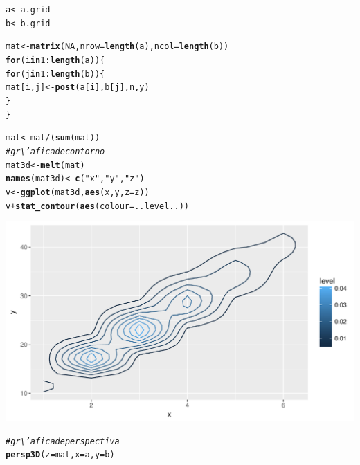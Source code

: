 \documentclass[10pt,openright]{book}\usepackage[]{graphicx}\usepackage[]{color}
\makeatletter
\def\maxwidth{ %
  \ifdim\Gin@nat@width>\linewidth
    \linewidth
  \else
    \Gin@nat@width
  \fi
}
\newcommand{\hlnum}[1]{\textcolor[rgb]{0.686,0.059,0.569}{#1}}%
\newcommand{\hlstr}[1]{\textcolor[rgb]{0.192,0.494,0.8}{#1}}%
\newcommand{\hlcom}[1]{\textcolor[rgb]{0.678,0.584,0.686}{\textit{#1}}}%
\newcommand{\hlopt}[1]{\textcolor[rgb]{0,0,0}{#1}}%
\newcommand{\hlstd}[1]{\textcolor[rgb]{0.345,0.345,0.345}{#1}}%
\newcommand{\hlkwa}[1]{\textcolor[rgb]{0.161,0.373,0.58}{\textbf{#1}}}%
\newcommand{\hlkwb}[1]{\textcolor[rgb]{0.69,0.353,0.396}{#1}}%
\newcommand{\hlkwc}[1]{\textcolor[rgb]{0.333,0.667,0.333}{#1}}%
\newcommand{\hlkwd}[1]{\textcolor[rgb]{0.737,0.353,0.396}{\textbf{#1}}}%
\newenvironment{kframe}{%
 \def\at@end@of@kframe{}%
 \ifinner\ifhmode%
  \def\at@end@of@kframe{\end{minipage}}%
  \begin{minipage}{\columnwidth}%
 \fi\fi%
 \def\FrameCommand##1{\hskip\@totalleftmargin \hskip-\fboxsep
 \colorbox{shadecolor}{##1}\hskip-\fboxsep
     \hskip-\linewidth \hskip-\@totalleftmargin \hskip\columnwidth}%
 \MakeFramed {\advance\hsize-\width
   \@totalleftmargin\z@ \linewidth\hsize
   \@setminipage}}%
 {\par\unskip\endMakeFramed%
 \at@end@of@kframe}
\newenvironment{knitrout}{}{} %
\makeatother
\begin{document}
\begin{knitrout}
\color{fgcolor}\begin{kframe}
\begin{alltt}
 \hlstd{a}\hlkwb{<-}\hlstd{a.grid}
 \hlstd{b}\hlkwb{<-}\hlstd{b.grid}

 \hlstd{mat}\hlkwb{<-}\hlkwd{matrix}\hlstd{(}\hlnum{NA}\hlstd{,} \hlkwc{nrow}\hlstd{=}\hlkwd{length}\hlstd{(a),} \hlkwc{ncol}\hlstd{=}\hlkwd{length}\hlstd{(b))}
 \hlkwa{for}\hlstd{(i} \hlkwa{in} \hlnum{1}\hlopt{:}\hlkwd{length}\hlstd{(a))\{}
 \hlkwa{for}\hlstd{(j} \hlkwa{in} \hlnum{1}\hlopt{:}\hlkwd{length}\hlstd{(b))\{}
   \hlstd{mat[i,j]}\hlkwb{<-}\hlkwd{post}\hlstd{(a[i],b[j],n,y)}
 \hlstd{\}}
 \hlstd{\}}

 \hlstd{mat}\hlkwb{<-}\hlstd{mat}\hlopt{/}\hlstd{(}\hlkwd{sum}\hlstd{(mat))}
\hlcom{# gr\textbackslash{}'afica de contorno}
  \hlstd{mat3d} \hlkwb{<-} \hlkwd{melt}\hlstd{(mat)}
  \hlkwd{names}\hlstd{(mat3d)} \hlkwb{<-} \hlkwd{c}\hlstd{(}\hlstr{"x"}\hlstd{,} \hlstr{"y"}\hlstd{,} \hlstr{"z"}\hlstd{)}
  \hlstd{v} \hlkwb{<-} \hlkwd{ggplot}\hlstd{(mat3d,} \hlkwd{aes}\hlstd{(x, y,} \hlkwc{z} \hlstd{= z))}
  \hlstd{v} \hlopt{+} \hlkwd{stat_contour}\hlstd{(}\hlkwd{aes}\hlstd{(}\hlkwc{colour} \hlstd{= ..level..))}
\end{alltt}
\end{kframe}
\includegraphics[width=\maxwidth]{figure/unnamed-chunk-70-1} 
\begin{kframe}\begin{alltt}
\hlcom{# gr\textbackslash{}'afica de perspectiva}
  \hlkwd{persp3D}\hlstd{(}\hlkwc{z}\hlstd{=mat,} \hlkwc{x}\hlstd{=a,} \hlkwc{y}\hlstd{=b)}
\end{alltt}
\end{kframe}

\end{knitrout}
\end{document}
